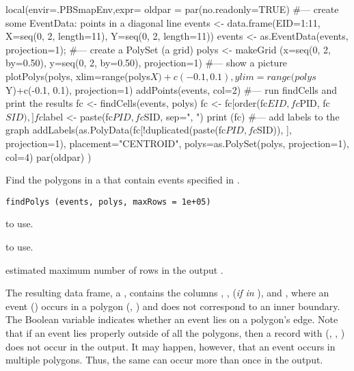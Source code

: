 \documentclass[letterpaper]{book}
\begin{document}
\begin{Examples}
\begin{ExampleCode}
local(envir=.PBSmapEnv,expr={
  oldpar = par(no.readonly=TRUE)
  #--- create some EventData: points in a diagonal line
  events <- data.frame(EID=1:11, X=seq(0, 2, length=11),
     Y=seq(0, 2, length=11))
  events <- as.EventData(events, projection=1);
  #--- create a PolySet (a grid)
  polys <- makeGrid (x=seq(0, 2, by=0.50), y=seq(0, 2, by=0.50), projection=1)
  #--- show a picture
  plotPolys(polys, xlim=range(polys$X)+c(-0.1, 0.1),
    ylim=range(polys$Y)+c(-0.1, 0.1), projection=1)
  addPoints(events, col=2)
  #--- run findCells and print the results
  fc <- findCells(events, polys)
  fc <- fc[order(fc$EID, fc$PID, fc$SID), ]
  fc$label <- paste(fc$PID, fc$SID, sep=", ")
  print (fc)
  #--- add labels to the graph
  addLabels(as.PolyData(fc[!duplicated(paste(fc$PID,fc$SID)), ],
    projection=1), placement="CENTROID", 
    polys=as.PolySet(polys, projection=1), col=4)
  par(oldpar)
})
\end{ExampleCode}
\end{Examples}
%
\begin{Description}\relax
Find the polygons in a  that contain events specified in
.
\end{Description}
%
\begin{Usage}
\begin{verbatim}
findPolys (events, polys, maxRows = 1e+05)
\end{verbatim}
\end{Usage}
%
\begin{Arguments}
\begin{ldescription}
\item[\code{events}]  to use.
\item[\code{polys}]  to use.
\item[\code{maxRows}] estimated maximum number of rows in the output
.
\end{ldescription}
\end{Arguments}
%
\begin{Details}\relax
The resulting data frame, a , contains the columns
, ,  (\emph{if in} ), and
, where an event () occurs in a polygon
(, ) and  does not correspond to an
inner boundary.  The Boolean variable  indicates whether an
event lies on a polygon's edge.  Note that if an event lies properly
outside of all the polygons, then a record with (,
, ) does not occur in the output.  It may happen,
however, that an event occurs in multiple polygons.  Thus, the same
 can occur more than once in the output.
\end{Details}
\end{document}

